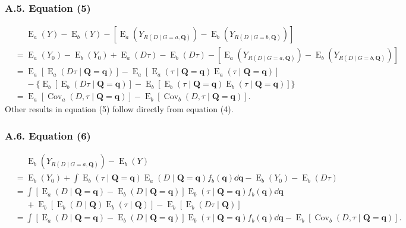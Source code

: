 \documentclass[12pt,a4paper]{article}
\newcommand{\Cov}{\operatorname{Cov}}
\newcommand{\E}{\operatorname{E}}
\def\Q{{\boldsymbol Q}}
\def\q{{\boldsymbol q}}
\begin{document}
\subsubsection*{A.5. Equation (5)}
\begin{align*}
    &\phantom{{}={}} \E_a(Y)-\E_b(Y)-[\E_a(Y_{R(D \mid G=a,\Q)})-\E_b(Y_{R(D \mid G=b,\Q)})] \\
    &= \E_a(Y_0)-\E_b(Y_0) + \E_a(D \tau) - \E_b(D \tau) -[\E_a(Y_{R(D \mid G=a,\Q)})-\E_b(Y_{R(D \mid G=b,\Q)})] \\
    &= \E_a[\E_a(D \tau \mid \Q=\q)] - \E_a[\E_a(\tau \mid \Q=\q)\E_a(\tau \mid \Q=\q)] \\
    &\phantom{{}={}} - \lbrace \E_b[\E_b(D \tau \mid \Q=\q)] - \E_b[\E_b(\tau \mid \Q=\q)\E_b(\tau \mid \Q=\q)] \rbrace \\
    &= \E_a[\Cov_a(D, \tau \mid \Q=\q)]- \E_b[\Cov_b(D, \tau \mid \Q=\q)].
\end{align*}
Other results in equation (5) follow directly from equation (4).

\subsubsection*{A.6. Equation (6)}
\begin{align*}
    &\phantom{{}={}} \E_b(Y_{R(D \mid G=a, \boldsymbol{Q})})-\E_b(Y) \\
    &= \E_b(Y_0) + \int \E_b(\tau \mid \Q=\q) \E_a(D \mid \Q=\q) f_b(\q) \dd \q - \E_b(Y_0) - \E_b(D \tau) \\
    &= \int [\E_a(D \mid \Q=\q) - \E_b(D \mid \Q=\q) ] \E_b(\tau \mid \Q=\q) f_b(\q) \dd \q \\
    &\phantom{{}={}} + \E_b [\E_b(D \mid \Q)\E_b(\tau \mid \Q) ] - \E_b[\E_b(D \tau \mid \Q)] \\
    &= \int [\E_a(D \mid \Q=\q) - \E_b(D \mid \Q=\q) ] \E_b(\tau \mid \Q=\q) f_b(\q) \dd \q - \E_b[\Cov_b(D, \tau \mid \Q=\q)].
\end{align*}
\end{document}
